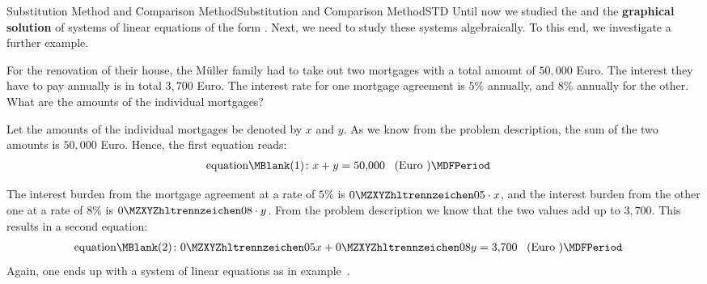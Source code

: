 \begin{MXContent}{Substitution Method and Comparison Method}{Substitution and Comparison Method}{STD}
Until now we studied the  and the \textbf{graphical solution}
of systems of linear equations of the form .
Next, we need to study these systems algebraically.
To this end, we investigate a further example.

\begin{MExample}
For the renovation of their house, the Müller family had to take out two mortgages with a total amount of
 $50{,}000$ Euro. The interest they have to pay annually is in total  $3{,}700$ Euro. The interest rate for 
one mortgage agreement is $5\%$ annually, and  $8\%$ annually for the other. What are the
amounts of the individual mortgages?

Let the amounts of the individual mortgages be denoted by $x$ and $y$. As we know from the 
problem description, the sum of the two amounts is $50{,}000$ Euro. Hence, the first 
equation reads:
\begin{eqnarray*}
\mbox{equation}\MBlank (1) & \colon x + y = 50{,}000 \; \; \; \mbox{(Euro )}\MDFPeriod 
\end{eqnarray*}

The interest burden from the mortgage agreement at a rate of $5\%$ is $\MZahl{0}{05} \cdot x$, 
and the interest burden from the other one at a rate of $8\%$ is $\MZahl{0}{08} \cdot y$. From
the problem description we know that the two values add up to $3{,}700$. This results in
a second equation:
\begin{eqnarray*}
\mbox{equation}\MBlank (2) & \colon \MZahl{0}{05} x + \MZahl{0}{08} y = 3{,}700 \; \; \; \mbox{(Euro )}\MDFPeriod 
\end{eqnarray*}
Again, one ends up with a system of linear equations as in example~.


\end{MExample}
\end{MXContent}
